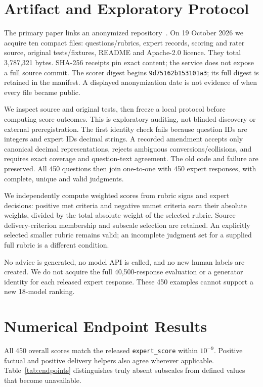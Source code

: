 \documentclass[sigconf,nonacm]{acmart}
\begin{document}
\section{Artifact and Exploratory Protocol}
The primary paper links an anonymized repository~\cite{artifact}. On 19 October 2026 we acquire ten compact files: questions/rubrics, expert records, scoring and rater source, original tests/fixtures, README and Apache-2.0 licence. They total 3,787,321 bytes. SHA-256 receipts pin exact content; the service does not expose a full source commit. The scorer digest begins \texttt{9d75162b153101a3}; its full digest is retained in the manifest. A displayed anonymization date is not evidence of when every file became public.

We inspect source and original tests, then freeze a local protocol before computing score outcomes. This is exploratory auditing, not blinded discovery or external preregistration. The first identity check fails because question IDs are integers and expert IDs decimal strings. A recorded amendment accepts only canonical decimal representations, rejects ambiguous conversions/collisions, and requires exact coverage and question-text agreement. The old code and failure are preserved. All 450 questions then join one-to-one with 450 expert responses, with complete, unique and valid judgments.

We independently compute weighted scores from rubric signs and expert decisions: positive met criteria and negative unmet criteria earn their absolute weights, divided by the total absolute weight of the selected rubric. Source delivery-criterion membership and subscale selection are retained. An explicitly selected smaller rubric remains valid; an incomplete judgment set for a supplied full rubric is a different condition.

No advice is generated, no model API is called, and no new human labels are created. We do not acquire the full 40,500-response evaluation or a generator identity for each released expert response. These 450 examples cannot support a new 18-model ranking.

\section{Numerical Endpoint Results}
All 450 overall scores match the released \texttt{expert\_score} within $10^{-9}$. Positive factual and positive delivery helpers also agree wherever applicable. Table~\ref{tab:endpoints} distinguishes truly absent subscales from defined values that become unavailable.
\end{document}
